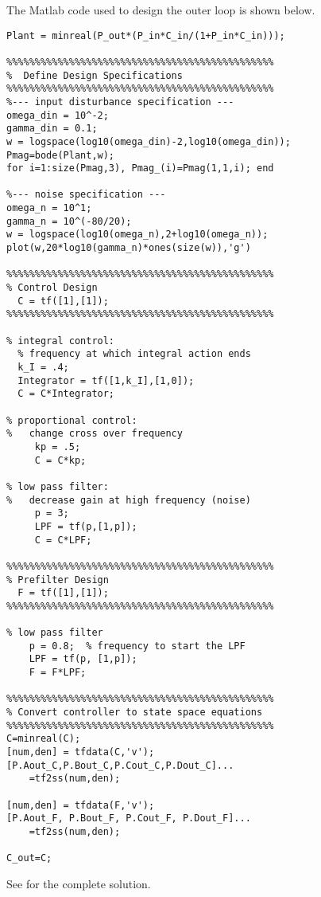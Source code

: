 The Matlab code used to design the outer loop is shown below.
\begin{lstlisting}
Plant = minreal(P_out*(P_in*C_in/(1+P_in*C_in)));

%%%%%%%%%%%%%%%%%%%%%%%%%%%%%%%%%%%%%%%%%%%%%%%
%  Define Design Specifications
%%%%%%%%%%%%%%%%%%%%%%%%%%%%%%%%%%%%%%%%%%%%%%%
%--- input disturbance specification ---
omega_din = 10^-2;  
gamma_din = 0.1;  
w = logspace(log10(omega_din)-2,log10(omega_din));
Pmag=bode(Plant,w);
for i=1:size(Pmag,3), Pmag_(i)=Pmag(1,1,i); end

%--- noise specification --- 
omega_n = 10^1;  
gamma_n = 10^(-80/20);   
w = logspace(log10(omega_n),2+log10(omega_n));
plot(w,20*log10(gamma_n)*ones(size(w)),'g')
        
%%%%%%%%%%%%%%%%%%%%%%%%%%%%%%%%%%%%%%%%%%%%%%%
% Control Design
  C = tf([1],[1]);
%%%%%%%%%%%%%%%%%%%%%%%%%%%%%%%%%%%%%%%%%%%%%%%

% integral control: 
  % frequency at which integral action ends
  k_I = .4; 
  Integrator = tf([1,k_I],[1,0]);
  C = C*Integrator;

% proportional control: 
%   change cross over frequency
     kp = .5;
     C = C*kp;

% low pass filter: 
%   decrease gain at high frequency (noise)
     p = 3;
     LPF = tf(p,[1,p]);
     C = C*LPF;

%%%%%%%%%%%%%%%%%%%%%%%%%%%%%%%%%%%%%%%%%%%%%%%
% Prefilter Design
  F = tf([1],[1]);
%%%%%%%%%%%%%%%%%%%%%%%%%%%%%%%%%%%%%%%%%%%%%%%

% low pass filter
    p = 0.8;  % frequency to start the LPF
    LPF = tf(p, [1,p]);
    F = F*LPF;

%%%%%%%%%%%%%%%%%%%%%%%%%%%%%%%%%%%%%%%%%%%%%%%
% Convert controller to state space equations 
%%%%%%%%%%%%%%%%%%%%%%%%%%%%%%%%%%%%%%%%%%%%%%%
C=minreal(C);
[num,den] = tfdata(C,'v');
[P.Aout_C,P.Bout_C,P.Cout_C,P.Dout_C]...
	=tf2ss(num,den);

[num,den] = tfdata(F,'v');
[P.Aout_F, P.Bout_F, P.Cout_F, P.Dout_F]...
	=tf2ss(num,den);

C_out=C;
\end{lstlisting}

See  for the complete solution.


